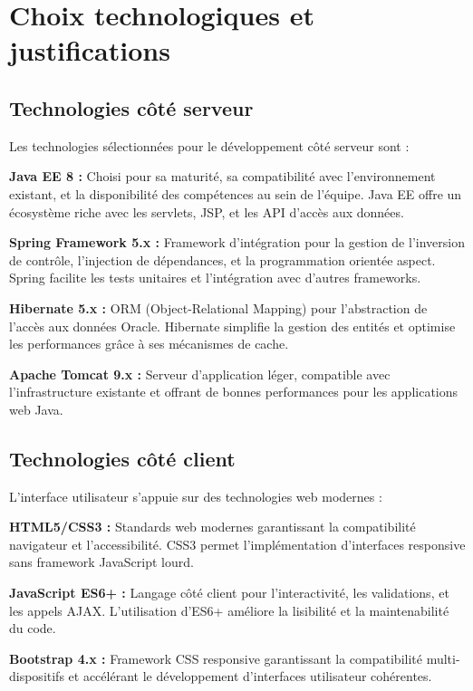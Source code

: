 \section{Choix technologiques et justifications}

\subsection{Technologies côté serveur}

Les technologies sélectionnées pour le développement côté serveur sont :

\medskip

\textbf{Java EE 8 :} Choisi pour sa maturité, sa compatibilité avec l'environnement existant, et la disponibilité des compétences au sein de l'équipe. Java EE offre un écosystème riche avec les servlets, JSP, et les API d'accès aux données.

\textbf{Spring Framework 5.x :} Framework d'intégration pour la gestion de l'inversion de contrôle, l'injection de dépendances, et la programmation orientée aspect. Spring facilite les tests unitaires et l'intégration avec d'autres frameworks.

\textbf{Hibernate 5.x :} ORM (Object-Relational Mapping) pour l'abstraction de l'accès aux données Oracle. Hibernate simplifie la gestion des entités et optimise les performances grâce à ses mécanismes de cache.

\textbf{Apache Tomcat 9.x :} Serveur d'application léger, compatible avec l'infrastructure existante et offrant de bonnes performances pour les applications web Java.

\subsection{Technologies côté client}

L'interface utilisateur s'appuie sur des technologies web modernes :

\medskip

\textbf{HTML5/CSS3 :} Standards web modernes garantissant la compatibilité navigateur et l'accessibilité. CSS3 permet l'implémentation d'interfaces responsive sans framework JavaScript lourd.

\textbf{JavaScript ES6+ :} Langage côté client pour l'interactivité, les validations, et les appels AJAX. L'utilisation d'ES6+ améliore la lisibilité et la maintenabilité du code.

\textbf{Bootstrap 4.x :} Framework CSS responsive garantissant la compatibilité multi-dispositifs et accélérant le développement d'interfaces utilisateur cohérentes.


